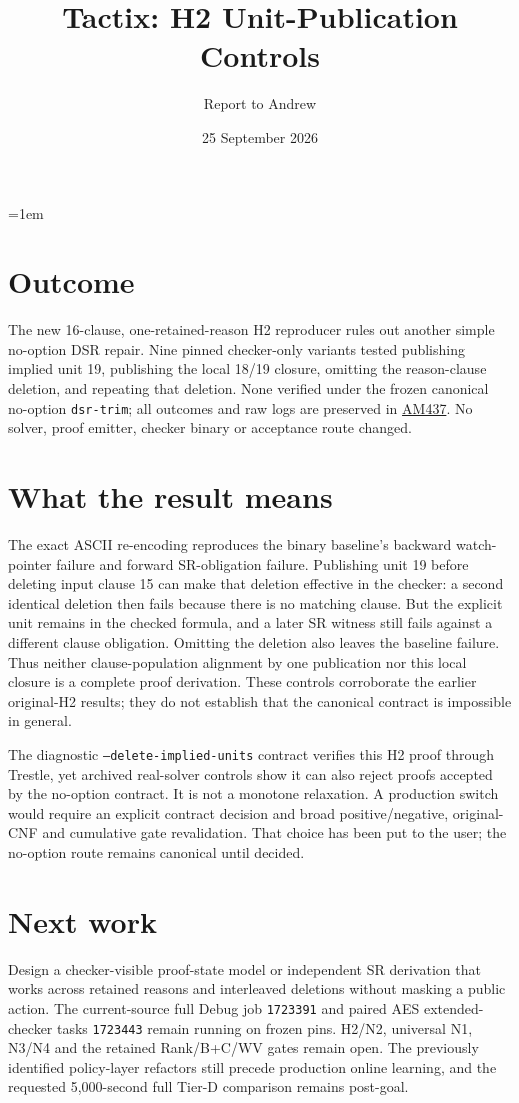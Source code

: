 \documentclass[10pt]{article}
\title{Tactix: H2 Unit-Publication Controls}
\author{Report to Andrew}
\date{25 September 2026}
\begin{document}
\maketitle
\vspace{-1.5em}
\emergencystretch=1em

\section*{Outcome}
The new 16-clause, one-retained-reason H2 reproducer rules out another
simple no-option DSR repair. Nine pinned checker-only variants tested
publishing implied unit 19, publishing the local 18/19 closure, omitting the
reason-clause deletion, and repeating that deletion. None verified under
the frozen canonical no-option \texttt{dsr-trim}; all outcomes and raw logs
are preserved in \href{../../benchmarks/reports/2026-09-25-am437-h2-unit-publication-controls.md}{AM437}.
No solver, proof emitter, checker binary or acceptance route changed.

\section*{What the result means}
The exact ASCII re-encoding reproduces the binary baseline's backward
watch-pointer failure and forward SR-obligation failure. Publishing unit 19
before deleting input clause 15 can make that deletion effective in the
checker: a second identical deletion then fails because there is no matching
clause. But the explicit unit remains in the checked formula, and a later SR
witness still fails against a different clause obligation. Omitting the
deletion also leaves the baseline failure. Thus neither clause-population
alignment by one publication nor this local closure is a complete proof
derivation. These controls corroborate the earlier original-H2 results; they
do not establish that the canonical contract is impossible in general.

The diagnostic \texttt{--delete-implied-units} contract verifies this H2
proof through Trestle, yet archived real-solver controls show it can also
reject proofs accepted by the no-option contract. It is not a monotone
relaxation. A production switch would require an explicit contract decision
and broad positive/negative, original-CNF and cumulative gate revalidation.
That choice has been put to the user; the no-option route remains canonical
until decided.

\section*{Next work}
Design a checker-visible proof-state model or independent SR derivation that
works across retained reasons and interleaved deletions without masking a
public action. The current-source full Debug job \texttt{1723391} and paired
AES extended-checker tasks \texttt{1723443} remain running on frozen pins.
H2/N2, universal N1, N3/N4 and the retained Rank/B+C/WV gates remain open.
The previously identified policy-layer refactors still precede production
online learning, and the requested 5,000-second full Tier-D comparison
remains post-goal.
\end{document}
